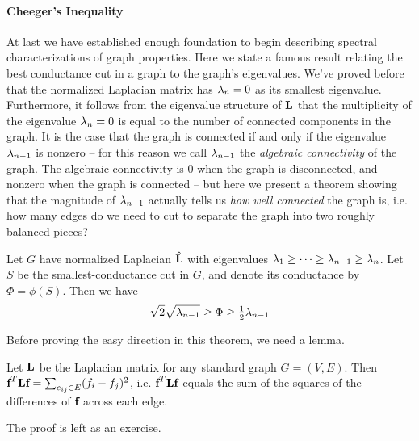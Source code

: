 \paragraph{Cheeger's Inequality}
 At last we have established enough foundation to begin describing spectral characterizations of graph properties. Here we state a famous result relating the best conductance cut in a graph to the graph's eigenvalues. We've proved before that the normalized Laplacian matrix has $\lambda_n = 0$ as its smallest eigenvalue. Furthermore, it follows from the eigenvalue structure of $\textbf{L}$ that the multiplicity of the eigenvalue $\lambda_n = 0$ is equal to the number of connected components in the graph. It is the case that the graph is connected if and only if the eigenvalue $\lambda_{n-1}$ is nonzero -- for this reason we call $\lambda_{n-1}$ the \emph{algebraic connectivity} of the graph. The algebraic connectivity is 0 when the graph is disconnected, and nonzero when the graph is connected -- but here we present a theorem showing that the magnitude of $\lambda_{n-1}$ actually tells us \emph{how well connected} the graph is, i.e. how many edges do we need to cut to separate the graph into two roughly balanced pieces?


 \begin{theorem}
   Let $G$ have normalized Laplacian $\hat{\textbf{L}}$ with eigenvalues $\lambda_1 \geq \cdots \geq \lambda_{n-1} \geq \lambda_{n}$. Let $S$ be the smallest-conductance cut in $G$, and denote its conductance by $\Phi = \phi(S)$. Then we have
   \[
\sqrt{2}\sqrt{\lambda_{n-1}} \geq \Phi \geq \tfrac{1}{2}\lambda_{n-1}
   \]
 \end{theorem}

 Before proving the easy direction in this theorem, we need a lemma.
\begin{lemma}\label{thm:laplacian-energy}
  Let $\textbf{L}$ be the Laplacian matrix for any standard graph $G = (V,E)$. Then $\textbf{f}^T \textbf{L} \textbf{f} = \sum_{e_{ij} \in E} (f_i - f_j)^2$, i.e. $\textbf{f}^T \textbf{L} \textbf{f}$ equals the sum of the squares of the differences of $\textbf{f}$ across each edge.
\end{lemma}
The proof is left as an exercise.

